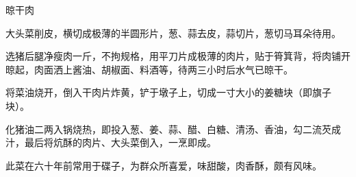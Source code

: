 \begin{recipe}{晾干肉}

\ingredients


\preparation

\step 大头菜削皮，横切成极薄的半圆形片，葱、蒜去皮，蒜切片，葱切马耳朵待用。

\step 选猪后腿净瘦肉一斤，不拘规格，用平刀片成极薄的肉片，贴于筲箕背，将肉铺开
晾起，肉面洒上酱油、胡椒面、料酒等，待两三小时后水气已晾干。

\step 将菜油烧开，倒入干肉片炸黄，铲于墩子上，切成一寸大小的姜糖块（即旗子块）。

\step 化猪油二两入锅烧热，即投入葱、姜、蒜、醋、白糖、清汤、香油，勾二流芡成
汁，最后将炕酥的肉片、大头菜倒入，一烹即成。

\features

此菜在六十年前常用于碟子，为群众所喜爱，味甜酸，肉香酥，颇有风味。

\end{recipe}

